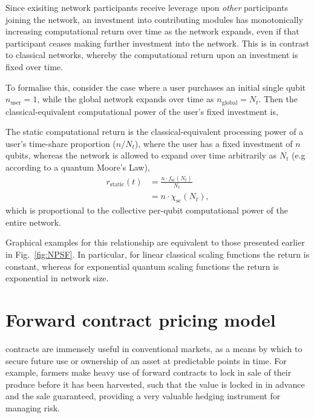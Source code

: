 Since exisiting network participants receive leverage upon \textit{other} participants joining the network, an investment into contributing modules has monotonically increasing computational return over time as the network expands, even if that participant ceases making further investment into the network. This is in contrast to classical networks, whereby the computational return upon an investment is fixed over time.

To formalise this, consider the case where a user purchases an initial single qubit \mbox{$n_\mathrm{user}=1$}, while the global network expands over time as \mbox{$n_\mathrm{global}=N_t$}. Then the classical-equivalent computational power of the user's fixed investment is,

\begin{definition} The static computational return is the classical-equivalent processing power of a user's time-share proportion (\mbox{$n/N_t$}), where the user has a fixed investment of $n$ qubits, whereas the network is allowed to expand over time arbitrarily as $N_t$ (e.g according to a quantum Moore's Law),
\begin{align}
	r_\mathrm{static}(t) &= \frac{n\cdot f_\mathrm{sc}(N_t)}{N_t}\nonumber\\
	&= n\cdot\chi_\mathrm{sc}(N_t),
\end{align}
which is proportional to the collective per-qubit computational power of the entire network.
\end{definition}

Graphical examples for this relationship are equivalent to those presented earlier in Fig.~\ref{fig:NPSF}. In particular, for linear classical scaling functions the return is constant, whereas for exponential quantum scaling functions the return is exponential in network size.

%
%

\section{Forward contract pricing model}\label{sec:for_contr}

 contracts are immensely useful in conventional markets, as a means by which to secure future use or ownership of an asset at predictable points in time. For example, farmers make heavy use of forward contracts to lock in sale of their produce before it has been harvested, such that the value is locked in in advance and the sale guaranteed, providing a very valuable hedging instrument for managing risk.

